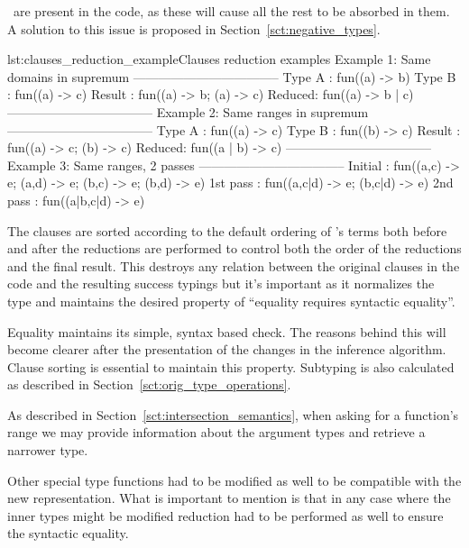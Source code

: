 \begin{description}
\begin{enumerate}
      \any\ are present in the code, as these will cause all the rest
      to be absorbed in them. A solution to this issue is proposed in
      Section~\ref{sct:negative_types}.
      \begin{console}{lst:clauses_reduction_example}{Clauses reduction examples}
        Example 1: Same domains in supremum
        -----------------------------------
        Type A : fun((a) -> b)
        Type B : fun((a) -> c)
        Result : fun((a) -> b; (a) -> c)
        Reduced: fun((a) -> b | c)
        -----------------------------------
        Example 2: Same ranges in supremum
        -----------------------------------
        Type A : fun((a) -> c)
        Type B : fun((b) -> c)
        Result : fun((a) -> c; (b) -> c)
        Reduced: fun((a | b) -> c)
        -----------------------------------
        Example 3: Same ranges, 2 passes
        -----------------------------------
        Initial  : fun((a,c) -> e; (a,d) -> e; (b,c) -> e; (b,d) -> e)
        1st pass : fun((a,c|d) -> e; (b,c|d) -> e)
        2nd pass : fun((a|b,c|d) -> e)

      \end{console}
  \end{enumerate}
\item[Sorting of clauses:] The clauses are sorted according to the
  default ordering of \er's terms both before and after the reductions
  are performed to control both the order of the reductions and the
  final result. This destroys any relation between the original
  clauses in the code and the resulting success typings but it's
  important as it normalizes the type and maintains the desired
  property of ``equality requires syntactic equality''.
\item[Equality and subtyping:] Equality maintains its simple, syntax
  based check. The reasons behind this will become clearer after the
  presentation of the changes in the inference algorithm. Clause
  sorting is essential to maintain this property. Subtyping is also
  calculated as described in Section~\ref{sct:orig_type_operations}.
\item[Function range:] As described in
  Section~\ref{sct:intersection_semantics}, when asking for a
  function's range we may provide information about the argument types
  and retrieve a narrower type.
\end{description}

Other special type functions had to be modified as well to be
compatible with the new representation. What is important to mention
is that in any case where the inner types might be modified reduction
had to be performed as well to ensure the syntactic equality.

